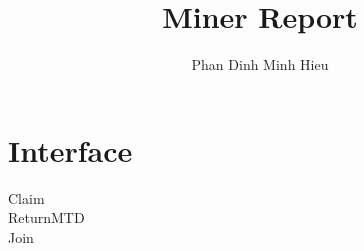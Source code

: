 \documentclass[a4paper, 11pt]{article}
\title{Miner Report}
\author{Phan Dinh Minh Hieu}
\begin{document}
\maketitle
\tableofcontents
\pagebreak

\section{Interface}
Claim
\\
ReturnMTD
\\
Join
\\


\end{document}
